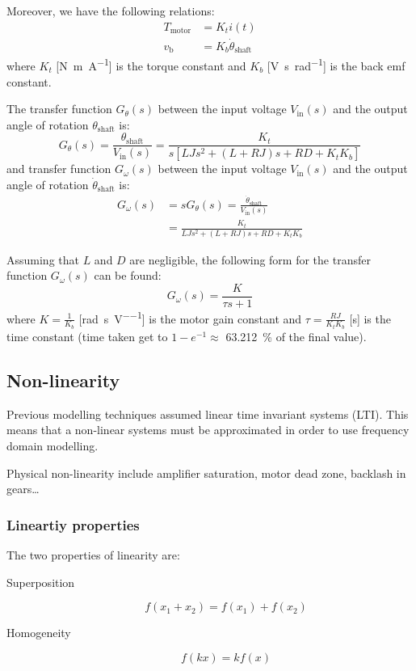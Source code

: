 \documentclass[10pt, twocolumn]{article}
\begin{document}
Moreover, we have the following relations:
\begin{align*}
  T_\mathrm{motor} & = K_t i(t)                        \\
  v_\mathrm{b}     & = K_b \dot{\theta}_\mathrm{shaft}
\end{align*}
where \(K_t\) [\si{\newton\metre\per\ampere}] is the torque constant and \(K_b\) [\si{\volt\second\per\radian}] is the back emf constant.

The transfer function \(G_\theta(s)\) between the input voltage \(V_\mathrm{in}(s)\) and the output angle of rotation \(\theta_\mathrm{shaft}\) is:
\[
  G_\theta(s) = \frac{\theta_\mathrm{shaft}}{V_\mathrm{in}(s)} = \frac{K_t}{s\left[ L J s^2 + (L + RJ)s + RD + K_t K_b \right]}
\]
and transfer function \(G_\omega(s)\) between the input voltage \(V_\mathrm{in}(s)\) and the output angle of rotation \(\dot{\theta}_\mathrm{shaft}\) is:
\begin{align*}
  G_\omega(s) & = sG_\theta(s) = \frac{\dot{\theta}_\mathrm{shaft}}{V_\mathrm{in}(s)} \\
              & = \frac{K_t}{L J s^2 + (L + RJ)s + RD + K_t K_b}
\end{align*}

Assuming that \(L\) and \(D\) are negligible, the following form for the transfer function \(G_\omega(s)\) can be found:
\[
  G_\omega(s) = \frac{K}{\tau s + 1}
\]
where \(K = \frac{1}{K_b}\) [\si{\radian\per\second\per\volt}] is the motor gain constant and \(\tau = \frac{RJ}{K_t K_b}\) [\si{\second}] is the time constant (time taken get to \(1 - e^{-1} \approx\) \SI{63.212}{\percent} of the final value).


\subsection{Non-linearity}
Previous modelling techniques assumed linear time invariant systems (LTI).
This means that a non-linear systems must be approximated in order to use frequency domain modelling.

\begin{example}
  Physical non-linearity include amplifier saturation, motor dead zone, backlash in gears\dots{}
\end{example}


\subsubsection{Lineartiy properties}
The two properties of linearity are:
\begin{description}
  \item[Superposition]
        \[
          f(x_1 + x_2) = f(x_1) + f(x_2)
        \]
  \item[Homogeneity]
        \[
          f(kx) = kf(x)
        \]
\end{description}
\end{document}
